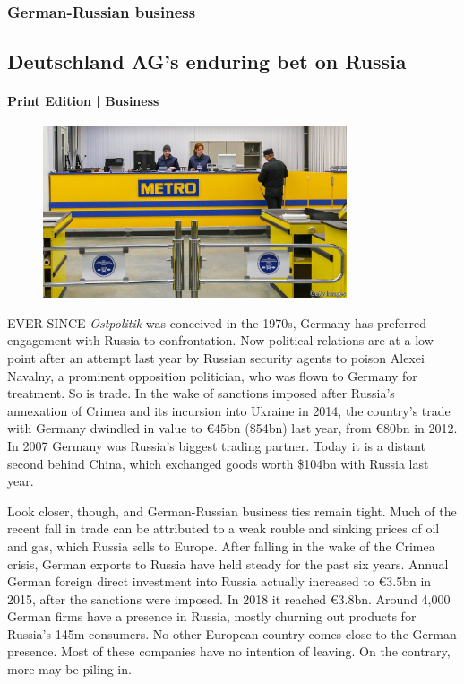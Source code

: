 \documentclass{article}
\begin{document}
\subsubsection{German-Russian business }
\subsection{Deutschland AG's enduring bet on Russia }
\paragraph{Print Edition | Business  \quad \color{gray}{Mar 25th 2021 }}
\begin{figure}[h]
\centering
\includegraphics[width=0.8\textwidth]{images/20210327_wbp503.jpg}
\end{figure}
\lettrine{E}VER SINCE \emph{Ostpolitik} was conceived in the 1970s, Germany has preferred engagement with Russia to confrontation. Now political relations are at a low point after an attempt last year by Russian security agents to poison Alexei Navalny, a prominent opposition politician, who was flown to Germany for treatment. So is trade. In the wake of sanctions imposed after Russia's annexation of Crimea and its incursion into Ukraine in 2014, the country's trade with Germany dwindled in value to €45bn (\$54bn) last year, from €80bn in 2012. In 2007 Germany was Russia's biggest trading partner. Today it is a distant second behind China, which exchanged goods worth \$104bn with Russia last year. 

Look closer, though, and German-Russian business ties remain tight. Much of the recent fall in trade can be attributed to a weak rouble and sinking prices of oil and gas, which Russia sells to Europe. After falling in the wake of the Crimea crisis, German exports to Russia have held steady for the past six years. Annual German foreign direct investment into Russia actually increased to €3.5bn in 2015, after the sanctions were imposed. In 2018 it reached €3.8bn. Around 4,000 German firms have a presence in Russia, mostly churning out products for Russia's 145m consumers. No other European country comes close to the German presence. Most of these companies have no intention of leaving. On the contrary, more may be piling in. 
\end{document}
